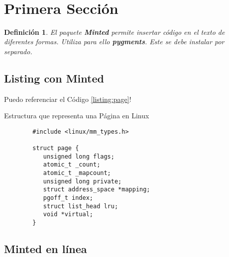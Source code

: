 \documentclass{article}
\title{                                             %
    \vspace{2in}
    \textmd{\textbf{\asignatura \\ \titulo}} \\         %
    \normalsize\vspace{0.1in}\small{\fecha}  \\         %
    \vspace{3in}
}
\author{\textbf{\autor}}                            %
\date{}                                             %
\newtheorem{definition}{Definición}[section]  %
\begin{document}
\maketitle



\newpage
\tableofcontents
\listoflistings      %
\newpage


\section{Primera Sección}

	\begin{definition}
	El paquete \textbf{Minted} permite insertar código en el texto de diferentes formas.
	Utiliza para ello \textbf{pygments}. Este se debe instalar por separado.
	\end{definition}

	\subsection{Listing con Minted}

		\lipsum[1]
		
		Puedo referenciar el Código \ref{listing:page}! 
		
		\begin{listing}
		\caption{Estructura que representa una Página en Linux}
		\begin{verbatim}
		#include <linux/mm_types.h>
		
		struct page {
		   unsigned long flags;
		   atomic_t _count;
		   atomic_t _mapcount;
		   unsigned long private;
		   struct address_space *mapping;
		   pgoff_t index;
		   struct list_head lru;
		   void *virtual;
		}
		\end{verbatim}
		\label{listing:page}
		\end{listing}

		\lipsum[2]


	\subsection{Minted en línea}
\end{document}
